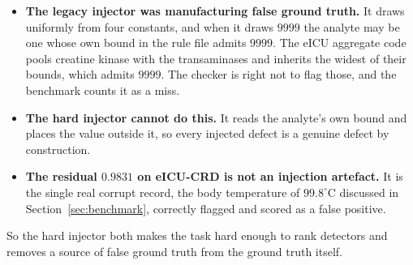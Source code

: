 \begin{itemize}[leftmargin=1.4em, itemsep=0.15em]
  \item \textbf{The legacy injector was manufacturing false ground truth.} It draws uniformly from four
        constants, and when it draws $9999$ the analyte may be one whose own bound in the rule file
        admits $9999$. The eICU aggregate code pools creatine
        kinase with the transaminases and inherits the widest of their bounds, which admits $9999$.
        The checker is right not to flag those, and the benchmark counts it as a miss.
  \item \textbf{The hard injector cannot do this.} It reads the analyte's own bound and places the
        value outside it, so every injected defect is a genuine defect by construction.
  \item \textbf{The residual $0.9831$ on eICU-CRD is not an injection artefact.} It is the single real
        corrupt record, the body temperature of $99.8^\circ$C discussed in
        Section~\ref{sec:benchmark}, correctly flagged and scored as a false positive.
\end{itemize}

So the hard injector both makes the task hard enough to rank detectors and removes a source of false
ground truth from the ground truth itself.

\FloatBarrier
